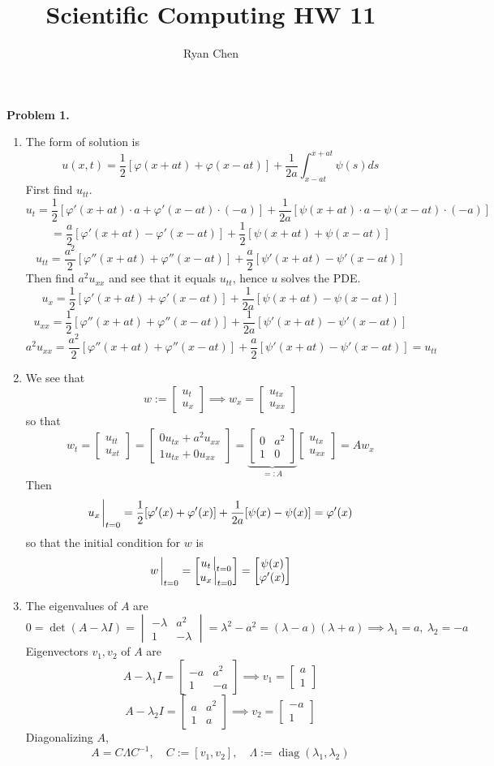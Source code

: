 \documentclass{article}
\title{Scientific Computing HW 11}
\author{Ryan Chen}
\def\tbf#1{\textbf{#1}}
\newcommand{\m}[2][b]{\begin{#1matrix}#2\end{#1matrix}}
\newcommand{\vp}{\varphi}
\newcommand{\inv}{^{-1}}
\newcommand{\imp}{\implies}
\DeclareMathOperator{\diag}{diag}
\begin{document}
	
\maketitle



\tbf{Problem 1.}

\begin{enumerate}[label=(\alph*)]
	
\item The form of solution is
$$u(x,t) = \frac12[\vp(x+at)+\vp(x-at)] + \frac{1}{2a}\int_{x-at}^{x+at}\psi(s)ds$$
First find $u_{tt}$.
$$u_t = \frac12[\vp'(x+at)\cdot a+\vp'(x-at)\cdot(-a)] + \frac{1}{2a}[\psi(x+at)\cdot a-\psi(x-at)\cdot(-a)]$$
$$= \frac{a}{2}[\vp'(x+at)-\vp'(x-at)] + \frac12[\psi(x+at)+\psi(x-at)]$$
$$u_{tt} = \frac{a^2}{2}[\vp''(x+at)+\vp''(x-at)] + \frac a2[\psi'(x+at)-\psi'(x-at)]$$
Then find $a^2u_{xx}$ and see that it equals $u_{tt}$, hence $u$ solves the PDE.
$$u_x = \frac12[\vp'(x+at)+\vp'(x-at)] + \frac{1}{2a}[\psi(x+at)-\psi(x-at)]$$
$$u_{xx} = \frac12[\vp''(x+at)+\vp''(x-at)] + \frac{1}{2a}[\psi'(x+at)-\psi'(x-at)]$$
$$a^2u_{xx} = \frac{a^2}{2}[\vp''(x+at)+\vp''(x-at)] + \frac{a}{2}[\psi'(x+at)-\psi'(x-at)] = u_{tt}$$


\item We see that
$$w := \m{u_t \\ u_x}
\imp w_x = \m{u_{tx} \\ u_{xx}}$$
so that
$$w_t = \m{u_{tt} \\ u_{xt}}
= \m{0u_{tx}+a^2u_{xx} \\ 1u_{tx}+0u_{xx}}
= \underbrace{\m{0 & a^2 \\ 1 & 0}}_{=:A}\m{u_{tx} \\ u_{xx}}
= Aw_x$$
Then
$$u_x\eval_{t=0} = \frac12[\vp'(x)+\vp'(x)] + \frac{1}{2a}[\psi(x)-\psi(x)]
= \vp'(x)$$
so that the initial condition for $w$ is
$$w\eval_{t=0} = \m{u_t\eval_{t=0} \\ u_x\eval_{t=0}}
= \m{\psi(x) \\ \vp'(x)}$$


\item The eigenvalues of $A$ are
$$0 = \det(A-\lambda I)
= \m[v]{-\lambda & a^2 \\ 1 & -\lambda}
= \lambda^2 - a^2
= (\lambda-a)(\lambda+a)
\imp \lambda_1 = a,~\lambda_2 = -a$$
Eigenvectors $v_1,v_2$ of $A$ are
$$A-\lambda_1I = \m{-a & a^2 \\ 1 & -a}
\imp v_1 = \m{a \\ 1}$$
$$A-\lambda_2I = \m{a & a^2 \\ 1 & a}
\imp v_2 = \m{-a \\ 1}$$
Diagonalizing $A$,
$$A = C\Lambda C\inv,
\quad C := [v_1,v_2],
\quad \Lambda := \diag(\lambda_1,\lambda_2)$$


\end{enumerate}
\end{document}
